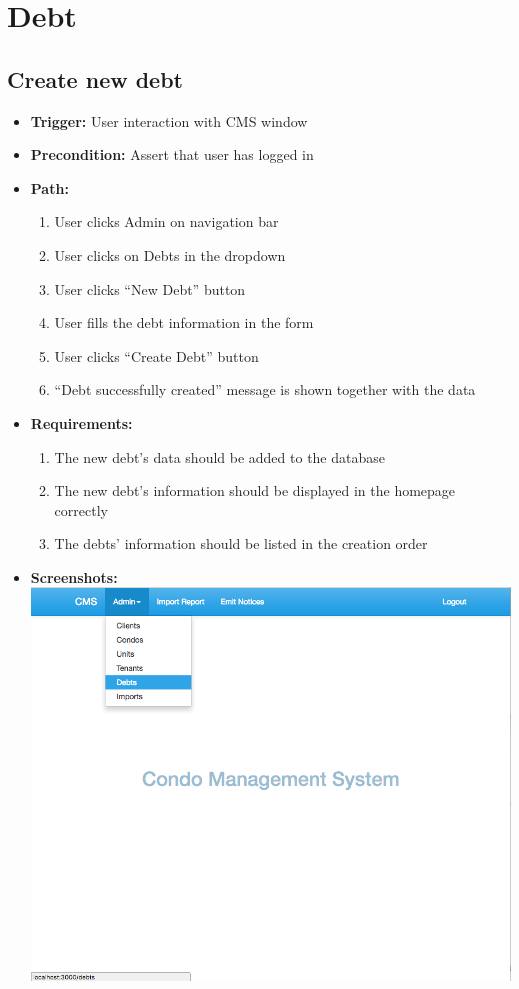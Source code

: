 \section*{Debt}

\subsection*{Create new debt}

\begin{itemize}
  \item[] \textbf{Trigger:} User interaction with CMS window
  \item[] \textbf{Precondition:} Assert that user has logged in
  \item[] \textbf{Path:}
    \begin{enumerate}
      \item User clicks Admin on navigation bar
      \item User clicks on Debts in the dropdown
      \item User clicks ``New Debt'' button
      \item User fills the debt information in the form
      \item User clicks ``Create Debt'' button
      \item ``Debt successfully created'' message is shown together with the data
    \end{enumerate}
  \item[] \textbf{Requirements:}
    \begin{enumerate}
      \item The new debt's data should be added to the database
      \item The new debt's information should be displayed in the homepage correctly
      \item The debts' information should be listed in the creation order
    \end{enumerate}
  \item[] \textbf{Screenshots:} \\
    \includegraphics[scale=0.25]{./images/ss/debt/create/1.png}

\end{itemize}
